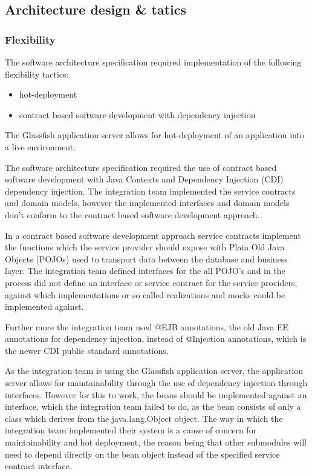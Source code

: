 \documentclass[a4paper,10pt]{article}
\begin{document}
\subsection{Architecture design \& tatics}
\subsubsection{Flexibility}
The software architecture specification required implementation of the following flexibility tactics:
\begin{itemize}
	\item hot-deployment
	\item contract based software development with dependency injection
\end{itemize}

The Glassfish application server allows for hot-deployment of an application into a live environment.

The software architecture specification required the use of contract based software development with Java Contexts and Dependency Injection (CDI) dependency injection.  The integration team implemented the service contracts and domain models, however the implemented interfaces and domain models don't conform to the contract based software development approach.

In a contract based software development approach service contracts implement the functions which the service provider should expose with Plain Old Java Objects (POJOs) used to transport data between the database and business layer.  The integration team defined interfaces for the all POJO's and in the process did not define an interface or service contract for the service providers, against which implementations or so called realizations and mocks could be implemented against.

Further more the integration team used @EJB annotations, the old Java EE annotations for dependency injection, instead of @Injection annotations, which is the newer CDI public standard annotations.

As the integration team is using the Glassfish application server, the application server allows for maintainability through the use of dependency injection through interfaces.  However for this to work, the beans should be implemented against an interface, which the integration team failed to do, as the bean consists of only a class which derives from the java.lang.Object object. The way in which the integration team implemented their system is a cause of concern for maintainability and hot deployment, the reason being that other submodules will need to depend directly on the bean object instead of the specified service contract interface.
\end{document}
